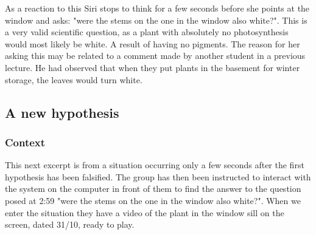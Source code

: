 As a reaction to this Siri stops to think for a few seconds before she points at the window and asks: "were the stems on the one in the window also white?". This is a very valid scientific question, as a plant with absolutely no photosynthesis would most likely be white. A result of having no pigments. The reason for her asking this may be related to a comment made by another student in a previous lecture. He had observed that when they put plants in the basement for winter storage, the leaves would turn white. 

\subsection{A new hypothesis}
\subsubsection*{Context}
This next excerpt is from a situation occurring only a few seconds after the first hypothesis has been falsified. The group has then been instructed to interact with the system on the computer in front of them to find the answer to the question posed at 2:59 "were the stems on the one in the window also white?". When we enter the situation they have a video of the plant in the window sill on the screen, dated 31/10, ready to play. 

